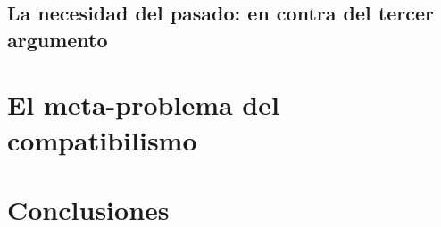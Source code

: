 \documentclass[12pt]{article} %
\begin{document}

	\subsection{La necesidad del pasado: en contra del tercer argumento}
	
\section{El meta-problema del compatibilismo}

\section{Conclusiones}

\newpage
\printbibliography[title={Referencias}]
\end{document}
